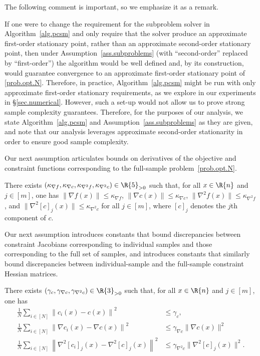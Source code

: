 The following comment is important, so we emphasize it as a remark.

\bremark
  If one were to change the requirement for the subproblem solver in Algorithm~\ref{alg.pcsm} and only require that the solver produce an approximate first-order stationary point, rather than an approximate second-order stationary point, then under Assumption~\ref{ass.subproblems} (with ``second-order'' replaced by ``first-order'') the algorithm would be well defined and, by its construction, would guarantee convergence to an approximate first-order stationary point of \eqref{prob.opt.N}.  Therefore, in practice, Algorithm~\ref{alg.pcsm} might be run with only approximate first-order stationary requirements, as we explore in our experiments in \S\ref{sec.numerical}.  However, such a set-up would not allow us to prove strong sample complexity guarantees.  Therefore, for the purposes of our analysis, we state Algorithm~\ref{alg.pcsm} and Assumption~\ref{ass.subproblems} as they are given, and note that our analysis leverages approximate second-order stationarity in order to ensure good sample complexity.
\eremark

Our next assumption articulates bounds on derivatives of the objective and constraint functions corresponding to the full-sample problem~\eqref{prob.opt.N}.

\bassumption\label{ass.boundness}
  There exists $(\kappa_{\nabla f}, \kappa_{\nabla c}, \kappa_{\nabla^2 f}, \kappa_{\nabla^2 c}) \in \R{5}_{>0}$ such that, for all $x \in \R{n}$ and $j \in [m]$, one has $\| \nabla f(x) \| \leq \kappa_{\nabla f}$, $\| \nabla c(x) \| \leq \kappa_{\nabla c}$, $\| \nabla^2 f(x) \| \leq \kappa_{\nabla^2 f}$, and $\| \nabla^2 [c]_j (x) \| \leq \kappa_{\nabla^2 c}$ for all $j \in [m]$, where $[c]_j$ denotes the $j$th component of $c$.
\eassumption

Our next assumption introduces constants that bound discrepancies between constraint Jacobians corresponding to individual samples and those corresponding to the full set of samples, and introduces constants that similarly bound discrepancies between individual-sample and the full-sample constraint Hessian matrices.

\bassumption\label{ass.bounded.distribute}
  There exists $(\gamma_c, \gamma_{\nabla c}, \gamma_{\nabla^2 c}) \in \R{3}_{>0}$ such that, for all $x \in \R{n}$ and $j \in [m]$, one has
  \begin{align*}
    \frac{1}{N} \sum_{i \in [N]} \left\| c_i(x) -  c(x) \right\|^2 &\leq \gamma_c, \\
    \frac{1}{N} \sum_{i \in [N]} \left\| \nabla c_i(x)-\nabla c(x) \right\|^2 &\leq \gamma_{\nabla c} \|\nabla c (x) \|^2 \\
    \frac{1}{N} \sum_{i \in [N]} \left\| \nabla^2 [c_i]_j(x) - \nabla^2 [c]_j(x) \right\|^2 &\leq \gamma_{\nabla^2 c} \| \nabla^2 [c]_j(x) \|^2.
  \end{align*}
\eassumption

